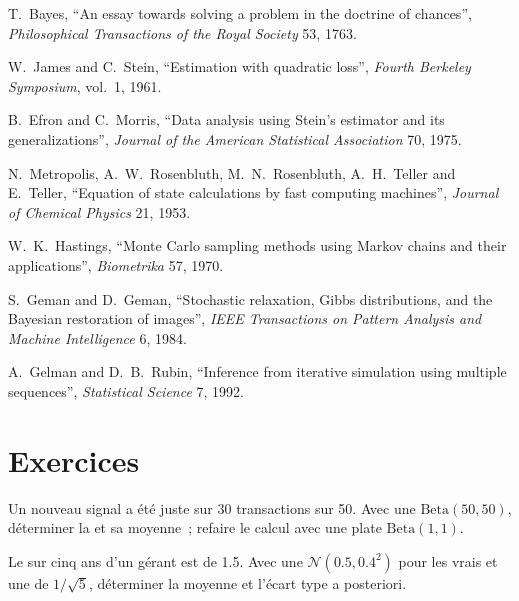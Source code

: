 \begin{omsources}
\item T.~Bayes, ``An essay towards solving a problem in the doctrine of chances'', \emph{Philosophical Transactions of the Royal Society}
53, 1763.
\item W.~James and C.~Stein, ``Estimation with quadratic loss'', \emph{Fourth Berkeley Symposium}, vol.~1, 1961.
\item B.~Efron and C.~Morris, ``Data analysis using Stein's estimator and its generalizations'', \emph{Journal of the American Statistical
Association} 70, 1975.
\item N.~Metropolis, A.~W.~Rosenbluth, M.~N.~Rosenbluth, A.~H.~Teller and E.~Teller, ``Equation of state calculations by fast computing
machines'', \emph{Journal of Chemical Physics} 21, 1953.
\item W.~K.~Hastings, ``Monte Carlo sampling methods using Markov chains and their applications'', \emph{Biometrika} 57, 1970.
\item S.~Geman and D.~Geman, ``Stochastic relaxation, Gibbs distributions, and the Bayesian restoration of images'', \emph{IEEE
Transactions on Pattern Analysis and Machine Intelligence} 6, 1984.
\item A.~Gelman and D.~B.~Rubin, ``Inference from iterative simulation using multiple sequences'', \emph{Statistical Science} 7, 1992.
\end{omsources}

\section{Exercices}

\begin{exercise}[$\star$]\label{exo:qm:bayesian-methods:1}
Un nouveau signal a été juste sur 30 transactions sur 50. Avec une  $\mathrm{Beta}(50, 50)$, déterminer la  et sa moyenne~; refaire le calcul avec une  plate
$\mathrm{Beta}(1, 1)$.
\end{exercise}

\begin{exercise}[$\star$]\label{exo:qm:bayesian-methods:2}
Le  sur cinq ans d'un gérant est de 1.5. Avec une  $\mathcal N(0.5, 0.4^2)$ pour les vrais  et une  de
$1/\sqrt5$, déterminer la moyenne et l'écart type a posteriori.
\end{exercise}

